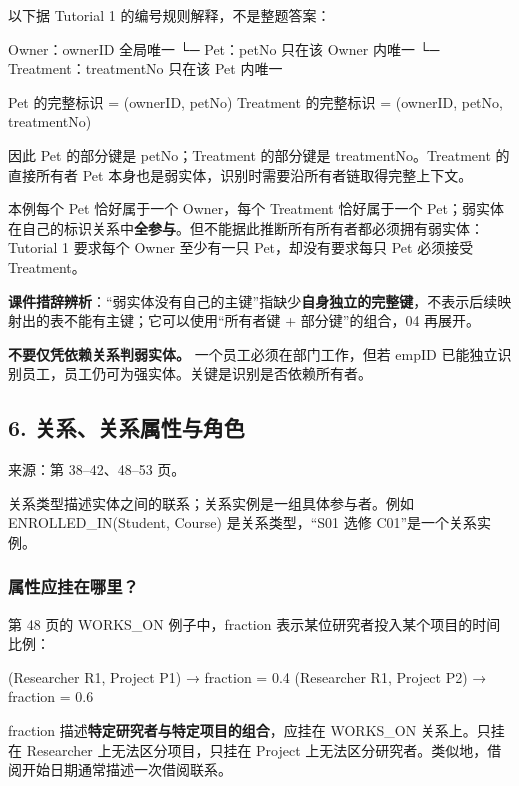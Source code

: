 以下据 Tutorial 1 的编号规则解释，不是整题答案：

\begin{StudyCode}
Owner：ownerID 全局唯一
  └─ Pet：petNo 只在该 Owner 内唯一
       └─ Treatment：treatmentNo 只在该 Pet 内唯一

Pet 的完整标识       = (ownerID, petNo)
Treatment 的完整标识 = (ownerID, petNo, treatmentNo)
\end{StudyCode}

因此 Pet 的部分键是 petNo；Treatment 的部分键是 treatmentNo。Treatment 的直接所有者 Pet 本身也是弱实体，识别时需要沿所有者链取得完整上下文。

本例每个 Pet 恰好属于一个 Owner，每个 Treatment 恰好属于一个 Pet；弱实体在自己的标识关系中\textbf{全参与}。但不能据此推断所有所有者都必须拥有弱实体：Tutorial 1 要求每个 Owner 至少有一只 Pet，却没有要求每只 Pet 必须接受 Treatment。

\textbf{课件措辞辨析}：``弱实体没有自己的主键''指缺少\textbf{自身独立的完整键}，不表示后续映射出的表不能有主键；它可以使用``所有者键 + 部分键''的组合，04 再展开。

\textbf{不要仅凭依赖关系判弱实体。} 一个员工必须在部门工作，但若 empID 已能独立识别员工，员工仍可为强实体。关键是识别是否依赖所有者。

\subsection{6. 关系、关系属性与角色}\label{02_er_modelling_zh-ux5173ux7cfbux5173ux7cfbux5c5eux6027ux4e0eux89d2ux8272}

来源：第 38--42、48--53 页。

关系类型描述实体之间的联系；关系实例是一组具体参与者。例如 ENROLLED\_IN(Student, Course) 是关系类型，``S01 选修 C01''是一个关系实例。

\subsubsection{属性应挂在哪里？}\label{02_er_modelling_zh-ux5c5eux6027ux5e94ux6302ux5728ux54eaux91cc}

第 48 页的 WORKS\_ON 例子中，fraction 表示某位研究者投入某个项目的时间比例：

\begin{StudyCode}
(Researcher R1, Project P1) → fraction = 0.4
(Researcher R1, Project P2) → fraction = 0.6
\end{StudyCode}

fraction 描述\textbf{特定研究者与特定项目的组合}，应挂在 WORKS\_ON 关系上。只挂在 Researcher 上无法区分项目，只挂在 Project 上无法区分研究者。类似地，借阅开始日期通常描述一次借阅联系。

